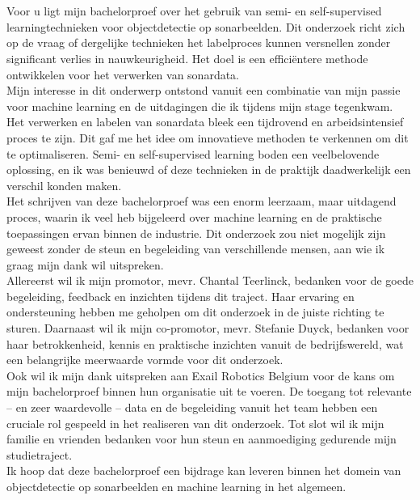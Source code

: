 
\chapter*{}%
\label{ch:voorwoord}

Voor u ligt mijn bachelorproef over het gebruik van semi- en self-supervised learningtechnieken voor objectdetectie op sonarbeelden. Dit onderzoek richt zich op de vraag of dergelijke technieken het labelproces kunnen versnellen zonder significant verlies in nauwkeurigheid. Het doel is een efficiëntere methode ontwikkelen voor het verwerken van sonardata. \\

Mijn interesse in dit onderwerp ontstond vanuit een combinatie van mijn passie voor machine learning en de uitdagingen die ik tijdens mijn stage tegenkwam. Het verwerken en labelen van sonardata bleek een tijdrovend en arbeidsintensief proces te zijn. Dit gaf me het idee om innovatieve methoden te verkennen om dit te optimaliseren. Semi- en self-supervised learning boden een veelbelovende oplossing, en ik was benieuwd of deze technieken in de praktijk daadwerkelijk een verschil konden maken. \\

Het schrijven van deze bachelorproef was een enorm leerzaam, maar uitdagend proces, waarin ik veel heb bijgeleerd over machine learning en de praktische toepassingen ervan binnen de industrie. Dit onderzoek zou niet mogelijk zijn geweest zonder de steun en begeleiding van verschillende mensen, aan wie ik graag mijn dank wil uitspreken. \\

Allereerst wil ik mijn promotor, mevr. Chantal Teerlinck, bedanken voor de goede begeleiding, feedback en inzichten tijdens dit traject. Haar ervaring en ondersteuning hebben me geholpen om dit onderzoek in de juiste richting te sturen. Daarnaast wil ik mijn co-promotor, mevr. Stefanie Duyck, bedanken voor haar betrokkenheid, kennis en praktische inzichten vanuit de bedrijfswereld, wat een belangrijke meerwaarde vormde voor dit onderzoek. \\

Ook wil ik mijn dank uitspreken aan Exail Robotics Belgium voor de kans om mijn bachelorproef binnen hun organisatie uit te voeren. De toegang tot relevante -- en zeer waardevolle -- data en de begeleiding vanuit het team hebben een cruciale rol gespeeld in het realiseren van dit onderzoek. Tot slot wil ik mijn familie en vrienden bedanken voor hun steun en aanmoediging gedurende mijn studietraject. \\

Ik hoop dat deze bachelorproef een bijdrage kan leveren binnen het domein van objectdetectie op sonarbeelden en machine learning in het algemeen.